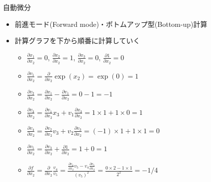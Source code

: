 \begin{frame}[t,fragile]{自動微分}
  \begin{itemize}
  \item 前進モード(Forward mode)・ボトムアップ型(Bottom-up)計算
  \item 計算グラフを下から順番に計算していく
    \begin{itemize}
    \item $\displaystyle \frac{\partial x_1}{\partial x_2} = 0$,
      $\displaystyle \frac{\partial x_2}{\partial x_2} = 1$,
      $\displaystyle \frac{\partial x_3}{\partial x_2} = 0$,
      $\displaystyle \frac{\partial 1}{\partial x_2} = 0$
    \item $\displaystyle \frac{\partial v_1}{\partial x_2} = \frac{\partial}{\partial x_2} \exp(x_2) = \exp(0) = 1$
    \item $\displaystyle \frac{\partial v_2}{\partial x_2} = \frac{\partial x_1}{\partial x_2} - \frac{\partial v_1}{\partial x_2} = 0-1 = -1$
    \item $\displaystyle \frac{\partial v_3}{\partial x_2} = \frac{\partial v_1}{\partial x_2} x_3 +  v_1 \frac{\partial x_3}{\partial x_2} = 1 \times 1 + 1 \times 0 = 1$
    \item $\displaystyle \frac{\partial v_4}{\partial x_2} = \frac{\partial v_2}{\partial x_2} v_3 +  v_2  \frac{\partial v_3}{\partial x_2} = (-1) \times 1 + 1 \times 1 = 0$
    \item $\displaystyle \frac{\partial v_5}{\partial x_2} = \frac{\partial v_3}{\partial x_2} +   \frac{\partial 1}{\partial x_2} = 1 + 0 = 1$
    \item $\displaystyle \frac{\partial f}{\partial x_2} = \frac{\partial}{\partial x_2} \frac{v_4}{v_5} = \frac{\frac{\partial v_4}{\partial x_2} v_5 - v_4 \frac{\partial v_5}{\partial x_2}}{(v_5)^2} = \frac{0 \times 2 - 1 \times 1}{2^2} = -1/4$
    \end{itemize}

\end{itemize}
\end{frame}
